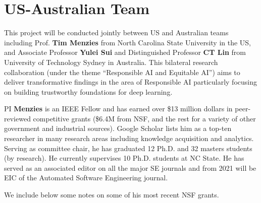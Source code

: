 \newpage

\section{US-Australian Team}\label{sec:PriorResults}

This project will be conducted jointly between US and Australian teams including Prof. \textbf{Tim Menzies} from North Carolina State University in the US, and Associate Professor \textbf{Yulei Sui} and Distinguished Professor \textbf{CT Lin} from University of Technology Sydney in Australia.
This bilateral research collaboration (under the theme ``Responsible AI and Equitable AI'') aims to deliver transformative findings in the area of Responsible AI particularly focusing on building trustworthy foundations for deep learning.

PI \textbf{Menzies} is an IEEE Fellow and has earned over \$13 million dollars in peer-reviewed competitive grants (\$6.4M from NSF, and  the rest for a variety of other government and industrial sources).
Google Scholar lists him as a top-ten researcher in many research areas including knowledge acquisition and analytics. Serving as committee chair, he has graduated 12 Ph.D. and 32 masters students (by research). He currently supervises 10 Ph.D. students at NC State. He has served as an associated editor on all the major SE journals and from 2021 will be EIC of the Automated Software Engineering journal. 


 We include below some notes  on some of his most recent NSF grants.


